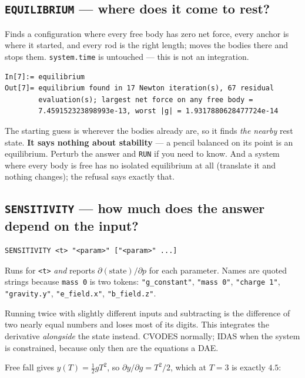 \documentclass[11pt]{article}
\newcommand{\kw}[1]{\texttt{\uppercase{#1}}}
\newcommand{\code}[1]{\texttt{#1}}
\begin{document}
\subsection{\kw{equilibrium} --- where does it come to rest?}

Finds a configuration where every free body has zero net force, every
anchor is where it started, and every rod is the right length; moves the
bodies there and stops them. \code{system.time} is untouched --- this is
not an integration.

\begin{lstlisting}
In[7]:= equilibrium
Out[7]= equilibrium found in 17 Newton iteration(s), 67 residual
        evaluation(s); largest net force on any free body =
        7.459152323898993e-13, worst |g| = 1.9317880628477724e-14
\end{lstlisting}

The starting guess is wherever the bodies already are, so it finds
\emph{the nearby} rest state. \textbf{It says nothing about stability}
--- a pencil balanced on its point is an equilibrium. Perturb the answer
and \kw{run} if you need to know. And a system where every body is free
has no isolated equilibrium at all (translate it and nothing changes);
the refusal says exactly that.

\subsection{\kw{sensitivity} --- how much does the answer depend on the input?}

\begin{lstlisting}
SENSITIVITY <t> "<param>" ["<param>" ...]
\end{lstlisting}

Runs for \code{<t>} \emph{and} reports $\partial(\text{state})/\partial
p$ for each parameter. Names are quoted strings because \code{mass 0} is
two tokens: \code{"g\_constant"}, \code{"mass 0"}, \code{"charge 1"},
\code{"gravity.y"}, \code{"e\_field.x"}, \code{"b\_field.z"}.

Running twice with slightly different inputs and subtracting is the
difference of two nearly equal numbers and loses most of its digits.
This integrates the derivative \emph{alongside} the state instead.
CVODES normally; IDAS when the system is constrained, because only then
are the equations a DAE.

Free fall gives $y(T)=\tfrac12 gT^2$, so $\partial y/\partial g = T^2/2$,
which at $T=3$ is exactly $4.5$:
\end{document}
